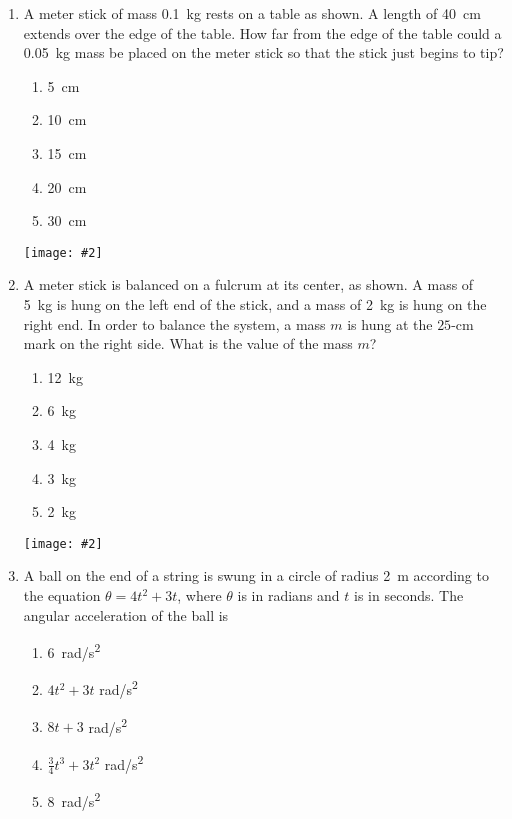 \documentclass[12pt]{article}
\newcommand{\pic}[2]{\texttt{[image: \#2]}}
\begin{document}
\begin{enumerate}[leftmargin=50pt,label=\underline{\hspace{0.4in}} \arabic*]
\item A meter stick of mass \SI{0.1}{\kg} rests on a table as shown. A length
  of \SI{40}{\cm} extends over the edge of the table. How far from the edge of
  the table could a \SI{0.05}{kg} mass be placed on the meter stick so that the
  stick just begins to tip?\\
  \begin{minipage}{0.3\textwidth}
    \begin{enumerate}[noitemsep,topsep=0pt]
    \item\SI{5 }{\cm}
    \item\SI{10}{\cm}
    \item\SI{15}{\cm}
    \item\SI{20}{\cm}
    \item\SI{30}{\cm}
    \end{enumerate}
  \end{minipage}
  \begin{minipage}{0.6\textwidth}
    \pic{.7}{beam1.png}
  \end{minipage}

\item A meter stick is balanced on a fulcrum at its center, as shown. A mass
  of \SI{5}{\kg} is hung on the left end of the stick, and a mass of \SI{2}{kg}
  is hung on the right end. In order to balance the system, a mass $m$ is hung
  at the $25$-\si{cm} mark on the right side. What is the value of the mass
  $m$?\\
  \begin{minipage}{0.3\textwidth}
    \begin{enumerate}[noitemsep,topsep=0pt]
    \item\SI{12}{\kg}
    \item\SI{6 }{\kg}
    \item\SI{4 }{\kg}
    \item\SI{3 }{\kg}
    \item\SI{2 }{\kg}
    \end{enumerate}
  \end{minipage}
  \begin{minipage}{0.6\textwidth}
    \pic{.9}{beam2.png}
  \end{minipage}

\item A ball on the end of a string is swung in a circle of radius \SI{2}{m}
  according to the equation $\theta = 4t^2 + 3t$, where $\theta$ is in radians
  and $t$ is in seconds. The angular acceleration of the ball is
  \begin{enumerate}[noitemsep,topsep=0pt]
  \item\SI{6}{rad/s^2}
  \item $4t^2 + 3t$ \si{rad/s^2}
  \item $8t +3$ \si{rad/s^2}
  \item $\frac{3}{4} t^3 + 3t^2$ \si{rad/s^2}
  \item \SI{8}{rad/s^2}
  \end{enumerate}
  \newpage
  

\end{enumerate}
\end{document}

